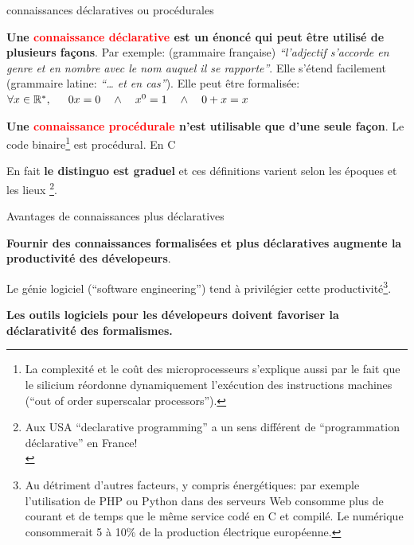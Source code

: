 \documentclass[final,a4,xcolor={svgnames,dvipsnames}]{beamer}
\begin{document}
 \begin{frame}{connaissances déclaratives ou procédurales}

   \textbf{Une \textcolor{red}{connaissance déclarative} est un énoncé qui peut être utilisé de
   plusieurs façons}. Par exemple: (grammaire française)
   \textit{``l'adjectif s'accorde en genre et en nombre avec le nom
     auquel il se rapporte''}. Elle s'étend facilement (grammaire
   latine: \textit{``\ldots\! et en cas''}). Elle peut être formalisée:
   $\forall x \in \mathbb{R}^{*}, \hspace{1.5em} 0x = 0  \hspace{1.em} \wedge \hspace{1.em} x^0 = 1 \hspace{1.em}  \wedge \hspace{1.em} 0+x = x$

   \bigskip

   \textbf{Une \textcolor{red}{connaissance procédurale} n'est
     utilisable que d'une seule façon}.
   Le code binaire\footnote{La
   complexité et le coût des microprocesseurs s'explique aussi par le
   fait que le silicium réordonne dynamiquement l'exécution des
   instructions machines (``out of order superscalar processors'').}
   est  procédural. En C
{}


   \smallskip

En fait \textbf{le distinguo est graduel} et ces définitions
varient selon les époques et les lieux
\footnote{Aux USA
 ``declarative programming'' a un sens différent de ``programmation
 déclarative'' en France!\\}.
 \end{frame}

 \begin{frame}{Avantages de connaissances plus déclaratives}
     
   \textbf{Fournir des connaissances formalisées et plus déclaratives
     augmente la productivité des dévelopeurs}.

   \bigskip

   Le génie logiciel (``software engineering'') tend à privilégier
   cette productivité\footnote{Au détriment d'autres facteurs, y
   compris énergétiques: par exemple l'utilisation de PHP ou Python dans des
   serveurs Web consomme plus de courant et de temps que le même
   service codé en C et compilé. Le numérique consommerait 5 à 10\% de la
   production électrique européenne.\medskip}.

   \bigskip
   \textbf{Les outils logiciels pour les dévelopeurs doivent favoriser
     la déclarativité des formalismes.}
 \end{frame}
\end{document}
